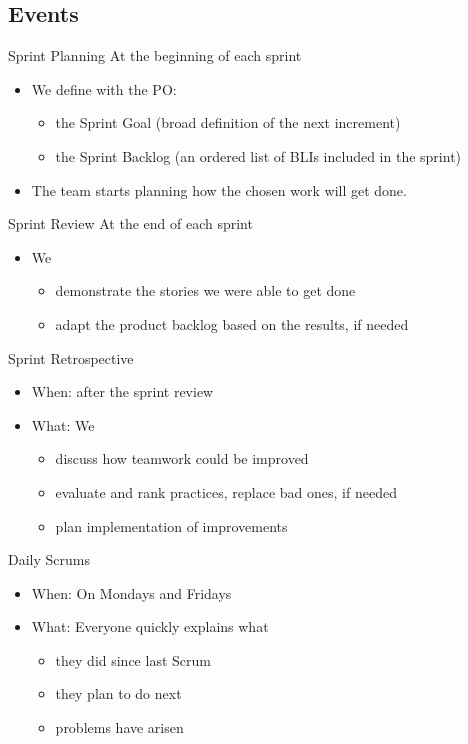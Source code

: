 \documentclass{beamer}
\begin{document}
\subsection{Events}
\begin{frame}{Sprint Planning}
  At the beginning of each sprint

  \begin{itemize}
  \item We define with the PO:
    \begin{itemize}
    \item the Sprint Goal (broad definition of the next increment)
    \item the Sprint Backlog (an ordered list of BLIs included in the sprint)
    \end{itemize}
  \item The team starts planning how the chosen work will get done.
  \end{itemize}
\end{frame}
\begin{frame}{Sprint Review}
  At the end of each sprint

  \begin{itemize}
  \item We
    \begin{itemize}
    \item demonstrate the stories we were able to get done
    \item adapt the product backlog based on the results, if needed
    \end{itemize}
  \end{itemize}
\end{frame}
\begin{frame}{Sprint Retrospective}
  \begin{itemize}
  \item When: after the sprint review
  \item What: We
    \begin{itemize}
    \item discuss how teamwork could be improved
    \item evaluate and rank practices, replace bad ones, if needed
    \item plan implementation of improvements
    \end{itemize}
  \end{itemize}
\end{frame}
\begin{frame}{Daily Scrums}
  \begin{itemize}
  \item When: On Mondays and Fridays
  \item What: Everyone quickly explains what
    \begin{itemize}
    \item they did since last Scrum
    \item they plan to do next
    \item problems have arisen
    \end{itemize}
  \end{itemize}
\end{frame}
\end{document}
